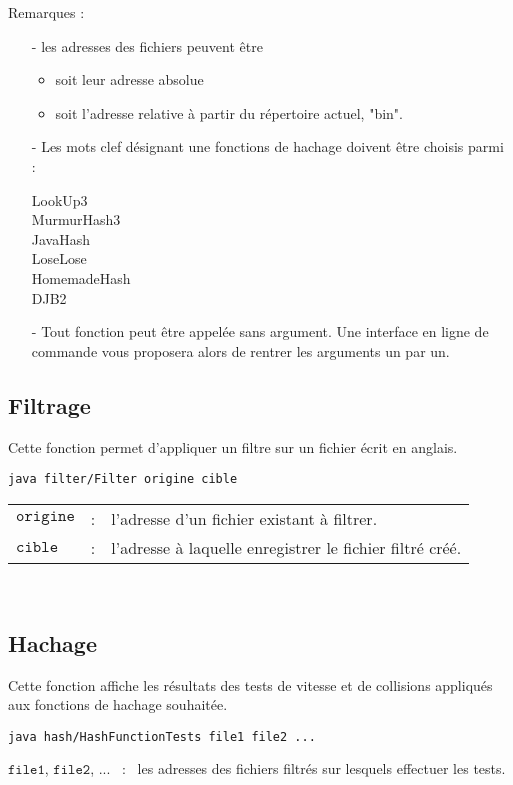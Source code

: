 \documentclass[12pt,a4paper,titlepage]{article}
\newcommand{\class}[1]{$\mathtt{#1}$}
\begin{document}
Remarques :
\begin{itemize}
\item[-] les adresses des fichiers peuvent être
	\begin{itemize}
	\item soit leur adresse absolue
	\item soit l'adresse relative à partir du répertoire actuel, "bin".
	\end{itemize}
\item[-] Les mots clef désignant une fonctions de hachage doivent être choisis parmi :
	\begin{center}
	LookUp3 \\
	MurmurHash3 \\
	JavaHash \\
	LoseLose \\
	HomemadeHash \\
	DJB2
	\end{center}
\item[-] Tout fonction peut être appelée sans argument. Une interface en ligne de commande vous proposera alors de rentrer les arguments un par un.
\end{itemize}



\subsection{Filtrage}
Cette fonction permet d'appliquer un filtre sur un fichier écrit en anglais.
\begin{lstlisting}
java filter/Filter origine cible
\end{lstlisting}
\begin{tabular}{lcl}
\class{origine} &:& l'adresse d'un fichier existant à filtrer.\\
\class{cible} &:& l'adresse à laquelle enregistrer le fichier filtré créé.
\end{tabular}\\


\subsection{Hachage}
Cette fonction affiche les résultats des tests de vitesse et de collisions appliqués aux fonctions de hachage souhaitée.
\begin{lstlisting}
java hash/HashFunctionTests file1 file2 ...
\end{lstlisting}
\class{file1}, \class{file2}, ... \ : \ les adresses des fichiers filtrés sur lesquels effectuer les tests.\\
\end{document}
